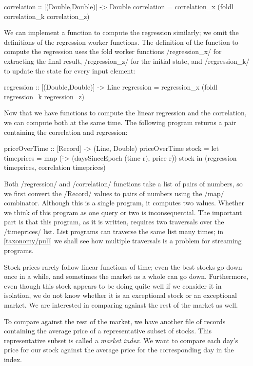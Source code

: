 \begin{haskell}
correlation :: [(Double,Double)] -> Double
correlation = correlation_x (foldl correlation_k correlation_z)
\end{haskell}


We can implement a function to compute the regression similarly; we omit the definitions of the regression worker functions.
The definition of the function to compute the regression uses the fold worker functions \Hs/regression_x/ for extracting the final result, \Hs/regression_z/ for the initial state, and \Hs/regression_k/ to update the state for every input element:

\begin{haskell}
regression :: [(Double,Double)] -> Line
regression = regression_x (foldl regression_k regression_z)
\end{haskell}

Now that we have functions to compute the linear regression and the correlation, we can compute both at the same time.
The following program returns a pair containing the correlation and regression:

\begin{haskell}
priceOverTime :: [Record] -> (Line, Double)
priceOverTime stock =
  let timeprices = map (\r -> (daysSinceEpoch (time r), price r)) stock
  in (regression timeprices, correlation timeprices)
\end{haskell}

Both \Hs/regression/ and \Hs/correlation/ functions take a list of pairs of numbers, so we first convert the \Hs/Record/ values to pairs of numbers using the \Hs/map/ combinator.
Although this is a single program, it computes two values.
Whether we think of this program as one query or two is inconsequential.
The important part is that this program, as it is written, requires two traversals over the \Hs/timeprices/ list.
List programs can traverse the same list many times; in \cref{taxonomy/pull} we shall see how multiple traversals is a problem for streaming programs.

Stock prices rarely follow linear functions of time; even the best stocks go down once in a while, and sometimes the market as a whole can go down.
Furthermore, even though this stock appears to be doing quite well if we consider it in isolation, we do not know whether it is an exceptional stock or an exceptional market.
We are interested in comparing against the rest of the market as well.

To compare against the rest of the market, we have another file of records containing the average price of a representative subset of stocks.
This representative subset is called a \emph{market index}.
We want to compare each day's price for our stock against the average price for the corresponding day in the index.

